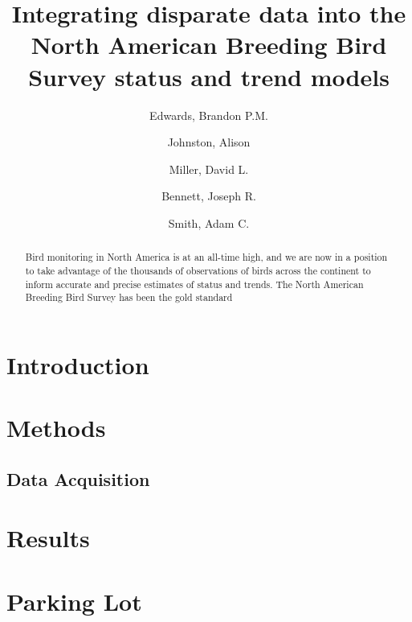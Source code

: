 \documentclass[12pt]{article}
\title{Integrating disparate data into the North American Breeding Bird Survey status and trend models}
\author{
	Edwards, Brandon P.M.\\
	\and
	Johnston, Alison\\
	\and
	Miller, David L.\\
	\and
	Bennett, Joseph R.\\
	\and
	Smith, Adam C.\\
}
\begin{document}
	
	\maketitle
	
	\begin{abstract}
		
		Bird monitoring in North America is at an all-time high, and we are now in a position to take advantage of the thousands of observations of birds across the continent to inform accurate and precise estimates of status and trends. The North American Breeding Bird Survey has been the gold standard
		
	\end{abstract}
	
	\section{Introduction}

	
	\section{Methods}
	\subsection{Data Acquisition}

	
	\section{Results}
	
	
	
	\section{Parking Lot}
	 
	
\end{document}

